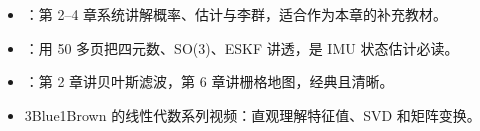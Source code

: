 \begin{reading}

\begin{itemize}
  \item \cite{barfoot2017state}：第 2--4 章系统讲解概率、估计与李群，适合作为本章的补充教材。
  \item \cite{sola2017eskf}：用 50 多页把四元数、SO(3)、ESKF 讲透，是 IMU 状态估计必读。
  \item \cite{thrun2005probabilistic}：第 2 章讲贝叶斯滤波，第 6 章讲栅格地图，经典且清晰。
  \item 3Blue1Brown 的线性代数系列视频：直观理解特征值、SVD 和矩阵变换。
\end{itemize}


\end{reading}


